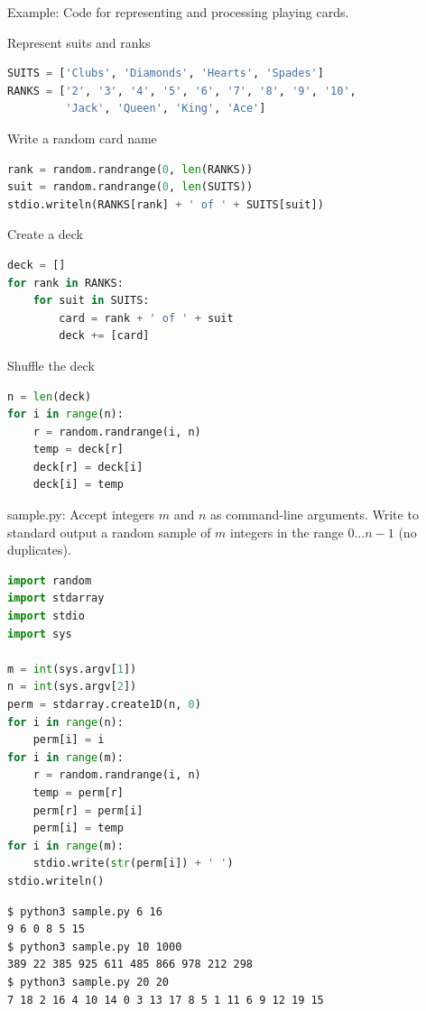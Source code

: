 \documentclass[8pt,a4paper,compress]{beamer}
\begin{document}
\begin{frame}[fragile]
\pause

\begin{framed}
\tiny Example: Code for representing and processing playing cards.
\end{framed}

\pause

Represent suits and ranks
\begin{lstlisting}[language=Python]
SUITS = ['Clubs', 'Diamonds', 'Hearts', 'Spades']
RANKS = ['2', '3', '4', '5', '6', '7', '8', '9', '10', 
         'Jack', 'Queen', 'King', 'Ace']
\end{lstlisting}

\pause

Write a random card name
\begin{lstlisting}[language=Python]
rank = random.randrange(0, len(RANKS))
suit = random.randrange(0, len(SUITS))
stdio.writeln(RANKS[rank] + ' of ' + SUITS[suit])
\end{lstlisting}

\pause

Create a deck
\begin{lstlisting}[language=Python]
deck = []
for rank in RANKS:
    for suit in SUITS:
        card = rank + ' of ' + suit
        deck += [card]
\end{lstlisting}

\pause

Shuffle the deck
\begin{lstlisting}[language=Python]
n = len(deck)
for i in range(n):
    r = random.randrange(i, n)
    temp = deck[r]
    deck[r] = deck[i]
    deck[i] = temp
\end{lstlisting}
\end{frame}

\begin{frame}[fragile]
\pause

\begin{framed}
\tiny sample.py: Accept integers $m$ and $n$ as command-line arguments. Write to standard output a random sample of $m$ integers in the range $0 \dots n-1$ (no duplicates).
\end{framed}

\begin{lstlisting}[language=Python]
import random
import stdarray
import stdio
import sys

m = int(sys.argv[1])
n = int(sys.argv[2])
perm = stdarray.create1D(n, 0)
for i in range(n):
    perm[i] = i
for i in range(m):
    r = random.randrange(i, n)
    temp = perm[r]
    perm[r] = perm[i]
    perm[i] = temp
for i in range(m):
    stdio.write(str(perm[i]) + ' ')
stdio.writeln()
\end{lstlisting}

\pause

\begin{lstlisting}[language={}]
$ python3 sample.py 6 16
9 6 0 8 5 15 
$ python3 sample.py 10 1000
389 22 385 925 611 485 866 978 212 298 
$ python3 sample.py 20 20
7 18 2 16 4 10 14 0 3 13 17 8 5 1 11 6 9 12 19 15 
\end{lstlisting}
\end{frame}
\end{document}
